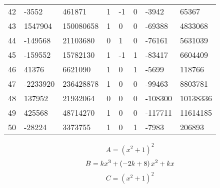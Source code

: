 \documentclass{amsart}
\begin{document}
\begin{longtable}{|l|l|l|lllll|}
42&-3552&461871&1&-1&0&-3942&65367\\
43&1547904&150080658&1&0&0&-69388&4833068\\
44&-149568&21103680&0&1&0&-76161&5631039\\
45&-159552&15782130&1&-1&1&-83417&6604409\\
46&41376&6621090&1&0&1&-5699&118766\\
47&-2233920&236428878&1&0&0&-99463&8803781\\
48&137952&21932064&0&0&0&-108300&10138336\\
49&425568&48714270&1&0&0&-117711&11614185\\
50&-28224&3373755&1&0&1&-7983&206893\\
\hline
\end{longtable}
$$A=(x^2
 + 1)^{2}$$
$$B=k\*x^3
 + \left(-2\*k
 + 8\right) \*x^2
 + k\*x$$
$$C=(x^2
 + 1)^{2}$$
\end{document}
